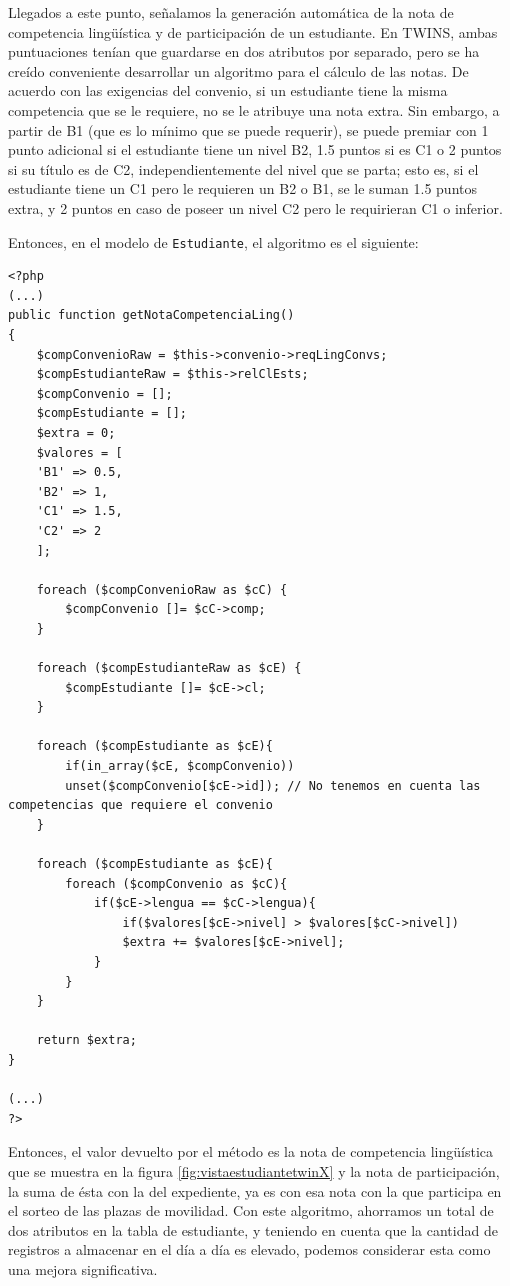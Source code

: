 Llegados a este punto, señalamos la generación automática de la nota de competencia lingüística y de participación de un estudiante. En TWINS, ambas puntuaciones tenían que guardarse en dos atributos por separado, pero se ha creído conveniente desarrollar un algoritmo para el cálculo de las notas.
De acuerdo con las exigencias del convenio, si un estudiante tiene la misma competencia que se le requiere, no se le atribuye una nota extra. Sin embargo, a partir de B1 (que es lo mínimo que se puede requerir), se puede premiar con 1 punto adicional si el estudiante tiene un nivel B2, 1.5 puntos si es C1 o 2 puntos si su título es de C2, independientemente del nivel que se parta; esto es, si el estudiante tiene un C1 pero le requieren un B2 o B1, se le suman 1.5 puntos extra, y 2 puntos en caso de poseer un nivel C2 pero le requirieran C1 o inferior.

Entonces, en el modelo de \texttt{Estudiante}, el algoritmo es el siguiente:

\begin{verbatim}
<?php
(...)
public function getNotaCompetenciaLing()
{
	$compConvenioRaw = $this->convenio->reqLingConvs;
	$compEstudianteRaw = $this->relClEsts;
	$compConvenio = [];
	$compEstudiante = [];
	$extra = 0;
	$valores = [
	'B1' => 0.5,
	'B2' => 1,
	'C1' => 1.5,
	'C2' => 2
	];
	
	foreach ($compConvenioRaw as $cC) {
		$compConvenio []= $cC->comp;
	}
	
	foreach ($compEstudianteRaw as $cE) {
		$compEstudiante []= $cE->cl;
	}
	
	foreach ($compEstudiante as $cE){
		if(in_array($cE, $compConvenio))
		unset($compConvenio[$cE->id]); // No tenemos en cuenta las competencias que requiere el convenio
	}
	
	foreach ($compEstudiante as $cE){
		foreach ($compConvenio as $cC){
			if($cE->lengua == $cC->lengua){
				if($valores[$cE->nivel] > $valores[$cC->nivel])
				$extra += $valores[$cE->nivel];
			}
		}
	}
	
	return $extra;
}

(...)
?>
\end{verbatim}

Entonces, el valor devuelto por el método es la nota de competencia lingüística que se muestra en la figura \ref{fig:vistaestudiantetwinX} y la nota de participación, la suma de ésta con la del expediente, ya es con esa nota con la que participa en el sorteo de las plazas de movilidad. Con este algoritmo, ahorramos un total de dos atributos en la tabla de estudiante, y teniendo en cuenta que la cantidad de registros a almacenar en el día a día es elevado, podemos considerar esta como una mejora significativa.

